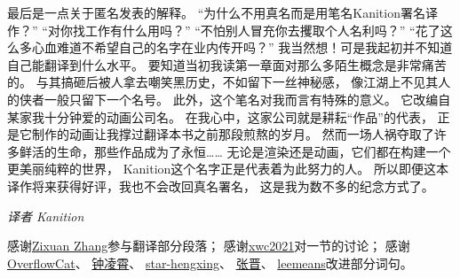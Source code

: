 最后是一点关于匿名发表的解释。
“为什么不用真名而是用笔名Kanition署名译作？”
“对你找工作有什么用吗？”
“不怕别人冒充你去攫取个人名利吗？”
“花了这么多心血难道不希望自己的名字在业内传开吗？”
我当然想！可是我起初并不知道自己能翻译到什么水平。
要知道当初我读第一章面对那么多陌生概念是非常痛苦的。
与其搞砸后被人拿去嘲笑黑历史，不如留下一丝神秘感，
像江湖上不见其人的侠者一般只留下一个名号。
此外，这个笔名对我而言有特殊的意义。
它改编自某家我十分钟爱的动画公司名。
在我心中，这家公司就是耕耘“作品”的代表，
正是它制作的动画让我撑过翻译本书之前那段煎熬的岁月。
然而一场人祸夺取了许多鲜活的生命，那些作品成为了永恒……
无论是渲染还是动画，它们都在构建一个更美丽纯粹的世界，
Kanition这个名字正是代表着为此努力的人。
所以即便这本译作将来获得好评，我也不会改回真名署名，
这是我为数不多的纪念方式了。

\vspace{15pt}
{\hfill {\itshape 译者 Kanition}\qquad}

\vspace{15pt}

感谢\href{https://zixuan-zhang.com}{Zixuan Zhang}参与翻译部分段落；
感谢\href{https://github.com/xwc2021}{xwc2021}对一节的讨论；
感谢\href{https://github.com/OverflowCat}{OverflowCat}、
\href{https://www.zhihu.com/people/zhong-ling-xiao}{钟凌霄}、
\href{https://github.com/star-hengxing}{star-hengxing}、
\href{https://theigrams.github.io/}{张晋}、
\href{https://github.com/leemeans}{leemeans}改进部分词句。